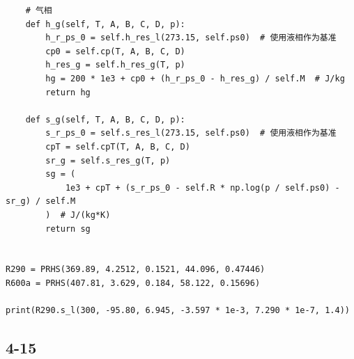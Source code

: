 \documentclass[12pt,a4paper]{article}
\begin{document}
\begin{lstlisting}
    # 气相
    def h_g(self, T, A, B, C, D, p):
        h_r_ps_0 = self.h_res_l(273.15, self.ps0)  # 使用液相作为基准
        cp0 = self.cp(T, A, B, C, D)
        h_res_g = self.h_res_g(T, p)
        hg = 200 * 1e3 + cp0 + (h_r_ps_0 - h_res_g) / self.M  # J/kg
        return hg

    def s_g(self, T, A, B, C, D, p):
        s_r_ps_0 = self.s_res_l(273.15, self.ps0)  # 使用液相作为基准
        cpT = self.cpT(T, A, B, C, D)
        sr_g = self.s_res_g(T, p)
        sg = (
            1e3 + cpT + (s_r_ps_0 - self.R * np.log(p / self.ps0) - sr_g) / self.M
        )  # J/(kg*K)
        return sg


R290 = PRHS(369.89, 4.2512, 0.1521, 44.096, 0.47446)
R600a = PRHS(407.81, 3.629, 0.184, 58.122, 0.15696)

print(R290.s_l(300, -95.80, 6.945, -3.597 * 1e-3, 7.290 * 1e-7, 1.4))

\end{lstlisting}

\subsection*{4-15}
\end{document}
